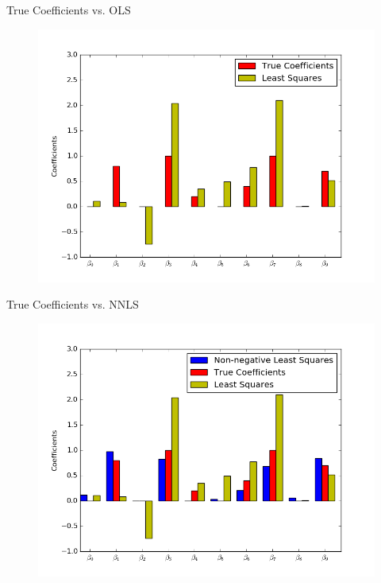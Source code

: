 \documentclass{beamer}
\begin{document}
\begin{frame}{True Coefficients vs. OLS}
	\vfill
	\begin{figure}
		\includegraphics[width=1\textwidth]{figs/nnls1.png}
	\end{figure}
	\vfill
\end{frame}

\begin{frame}{True Coefficients vs. NNLS}
	\vfill
	\begin{figure}
		\includegraphics[width=1\textwidth]{figs/nnls2.png}
	\end{figure}
	\vfill
\end{frame}
\end{document}
